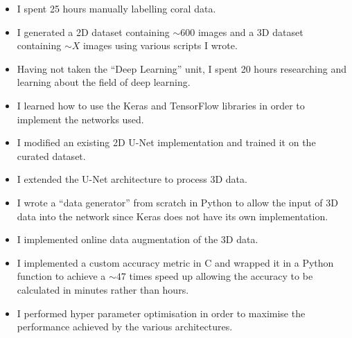 \begin{itemize}
    \item I spent 25 hours manually labelling coral data.
    \item I generated a 2D dataset containing ${\sim}600$ images and a 3D dataset containing ${\sim}X$ images using various scripts I wrote.
    \item Having not taken the ``Deep Learning'' unit, I spent 20 hours researching and learning about the field of deep learning.
    \item I learned how to use the Keras and TensorFlow libraries in order to implement the networks used.
    \item I modified an existing 2D U-Net implementation and trained it on the curated dataset.
    \item I extended the U-Net architecture to process 3D data.
    \item I wrote a ``data generator'' from scratch in Python to allow the input of 3D data into the network since Keras does not have its own implementation.
    \item I implemented online data augmentation of the 3D data.
    \item I implemented a custom accuracy metric in C and wrapped it in a Python function to achieve a ${\sim}47$ times speed up allowing the accuracy to be calculated in minutes rather than hours.
    \item I performed hyper parameter optimisation in order to maximise the performance achieved by the various architectures.
\end{itemize}